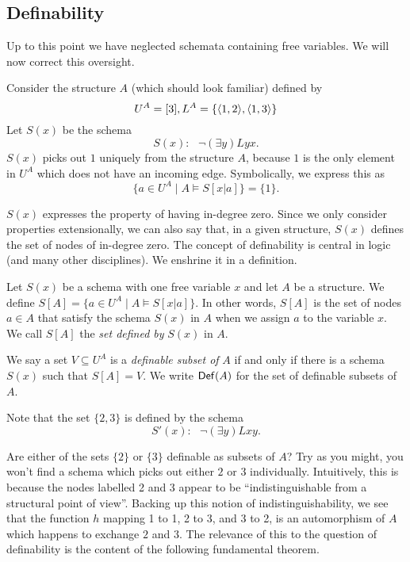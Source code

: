 \subsection{Definability}
Up to this point we have neglected schemata containing free variables. We will now correct this oversight. 

Consider the structure $A$ (which should look familiar) defined by
\[
    U^A = [3], L^A=\{\mbox{$\langle 1,2 \rangle$},\mbox{$\langle 1,3 \rangle$}\}
\]
Let $S(x)$ be the schema
\[
    S(x):\ \ \ \neg(\exists y)Lyx.
\]
$S(x)$ picks out $1$ uniquely from the structure $A$, because $1$ is the only element in $U^A$ which does not have an incoming edge. Symbolically, we express this as
\[
\{a\in U^A\mid A\models S[x|a]\}=\{1\}.
\]

$S(x)$ expresses the property of having in-degree zero. Since we only consider properties extensionally, we can also say that, in a given structure, $S(x)$ defines the set of nodes of in-degree zero. The concept of definability is central in logic (and many other disciplines). We enshrine it in a definition.

\begin{definition}
Let $S(x)$ be a schema with one free variable $x$ and let $A$ be a structure.
We define $S[A]=\{a\in U^A\mid A\models S[x|a]\}$. In other words, $S[A]$ is the set of nodes $a \in A$ that satisfy the schema $S(x)$ in $A$ when we assign $a$ to the variable $x$. We call $S[A]$ the \emph{set defined by} $S(x)$ in $A$.
\end{definition}

\begin{definition}
We say a set $V\subseteq U^A$ is a \emph{definable subset of} $A$ if and only if there is a schema $S(x)$ such that $S[A]=V$. We write $\mbox{$\mathsf{Def}(A)$}$ for the set of definable subsets of $A$.
\end{definition}

Note that the set $\{2,3\}$ is defined by the schema
\[
S'(x):\ \ \ \neg(\exists y)Lxy.
\]

Are either of the sets $\{2\}$ or $\{3\}$ definable as subsets of $A$? Try as you might, you won't find a schema which picks out either $2$ or $3$ individually. Intuitively, this is because the nodes labelled 2 and 3 appear to be ``indistinguishable from a structural point of view''. Backing up this notion of indistinguishability, we see that the function $h$ mapping 1 to 1, 2 to 3, and 3 to 2, is an automorphism of $A$ which happens to exchange $2$ and $3$. The relevance of this to the question of definability is the content of the following fundamental theorem.

